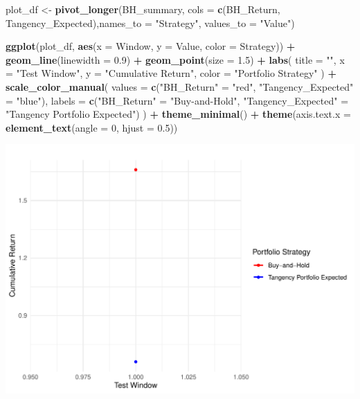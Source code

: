 \documentclass[
  12pt,
]{article}
\newenvironment{Shaded}{\begin{snugshade}}{\end{snugshade}}
\newcommand{\AttributeTok}[1]{\textcolor[rgb]{0.13,0.29,0.53}{#1}}
\newcommand{\DecValTok}[1]{\textcolor[rgb]{0.00,0.00,0.81}{#1}}
\newcommand{\FloatTok}[1]{\textcolor[rgb]{0.00,0.00,0.81}{#1}}
\newcommand{\FunctionTok}[1]{\textcolor[rgb]{0.13,0.29,0.53}{\textbf{#1}}}
\newcommand{\NormalTok}[1]{#1}
\newcommand{\OtherTok}[1]{\textcolor[rgb]{0.56,0.35,0.01}{#1}}
\newcommand{\SpecialCharTok}[1]{\textcolor[rgb]{0.81,0.36,0.00}{\textbf{#1}}}
\newcommand{\StringTok}[1]{\textcolor[rgb]{0.31,0.60,0.02}{#1}}
\begin{document}
\begin{Shaded}
\begin{Highlighting}[]
\NormalTok{plot\_df }\OtherTok{\textless{}{-}} \FunctionTok{pivot\_longer}\NormalTok{(BH\_summary, }\AttributeTok{cols =} \FunctionTok{c}\NormalTok{(BH\_Return, Tangency\_Expected),}\AttributeTok{names\_to =} \StringTok{"Strategy"}\NormalTok{, }\AttributeTok{values\_to =} \StringTok{"Value"}\NormalTok{)}

\FunctionTok{ggplot}\NormalTok{(plot\_df, }\FunctionTok{aes}\NormalTok{(}\AttributeTok{x =}\NormalTok{ Window, }\AttributeTok{y =}\NormalTok{ Value, }\AttributeTok{color =}\NormalTok{ Strategy)) }\SpecialCharTok{+}
  \FunctionTok{geom\_line}\NormalTok{(}\AttributeTok{linewidth =} \FloatTok{0.9}\NormalTok{) }\SpecialCharTok{+}
  \FunctionTok{geom\_point}\NormalTok{(}\AttributeTok{size =} \FloatTok{1.5}\NormalTok{) }\SpecialCharTok{+}
  \FunctionTok{labs}\NormalTok{(}
    \AttributeTok{title =} \StringTok{""}\NormalTok{,}
    \AttributeTok{x =} \StringTok{"Test Window"}\NormalTok{, }\AttributeTok{y =} \StringTok{"Cumulative Return"}\NormalTok{,}
    \AttributeTok{color =} \StringTok{"Portfolio Strategy"}
\NormalTok{  ) }\SpecialCharTok{+}
  \FunctionTok{scale\_color\_manual}\NormalTok{(}
    \AttributeTok{values =} \FunctionTok{c}\NormalTok{(}\StringTok{"BH\_Return"} \OtherTok{=} \StringTok{"red"}\NormalTok{, }\StringTok{"Tangency\_Expected"} \OtherTok{=} \StringTok{"blue"}\NormalTok{),}
    \AttributeTok{labels =} \FunctionTok{c}\NormalTok{(}\StringTok{"BH\_Return"} \OtherTok{=} \StringTok{"Buy{-}and{-}Hold"}\NormalTok{, }\StringTok{"Tangency\_Expected"} \OtherTok{=} \StringTok{"Tangency Portfolio Expected"}\NormalTok{)}
\NormalTok{  ) }\SpecialCharTok{+}
  \FunctionTok{theme\_minimal}\NormalTok{() }\SpecialCharTok{+}
  \FunctionTok{theme}\NormalTok{(}\AttributeTok{axis.text.x =} \FunctionTok{element\_text}\NormalTok{(}\AttributeTok{angle =} \DecValTok{0}\NormalTok{, }\AttributeTok{hjust =} \FloatTok{0.5}\NormalTok{))}
\end{Highlighting}
\end{Shaded}

\includegraphics{NDXNES005_A1_RMD_files/figure-latex/unnamed-chunk-19-1.pdf}
\end{document}
